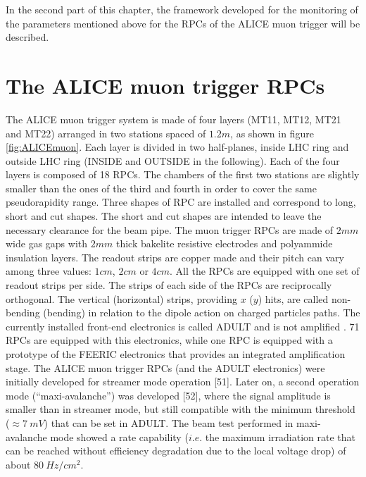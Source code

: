 
In the second part of this chapter, the framework developed for the monitoring of the parameters mentioned above for the RPCs of the ALICE muon trigger will be described.

\section{The ALICE muon trigger RPCs}
The ALICE muon trigger system is made of four layers (MT11, MT12, MT21 and MT22) arranged in two stations spaced of $1.2m$, as shown in figure \ref{fig:ALICEmuon}.
Each layer is divided in two half-planes, inside LHC ring and outside LHC ring (INSIDE and OUTSIDE in the following).
Each of the four layers is composed of 18 RPCs.
The chambers of the first two stations are slightly smaller than the ones of the third and fourth in order to cover the same pseudorapidity range.
Three shapes of RPC are installed and correspond to long, short and cut shapes.
The short and cut shapes are intended to leave the necessary clearance for the beam pipe.
The muon trigger RPCs are made of $2mm$ wide gas gaps with $2mm$ thick bakelite resistive electrodes and polyammide insulation layers.
The readout strips are copper made and their pitch can vary among three values: $1cm$, $2cm$ or $4cm$.
All the RPCs are equipped with one set of readout strips per side.
The strips of each side of the RPCs are reciprocally orthogonal.
The vertical (horizontal) strips, providing $x$ ($y$) hits, are called non-bending (bending) in relation to the dipole action on charged particles paths.
The currently installed front-end electronics is called ADULT and is not amplified \cite{Dupieux:2003bw}.
71 RPCs are equipped with this electronics, while one RPC is equipped with a prototype of the FEERIC electronics \cite{Marchisone:2017bcb} that provides an integrated amplification stage.
The ALICE muon trigger RPCs (and the ADULT electronics) were initially developed for streamer mode operation [51]. 
Later on, a second operation mode (“maxi-avalanche”) was developed [52], where the signal amplitude is smaller than in streamer mode, but still compatible with the minimum threshold ($\approx7\ mV$) that can be set in ADULT. 
The beam test performed in maxi-avalanche mode showed a rate capability ($i.e.$ the maximum irradiation rate that can be reached without efficiency degradation due to the local voltage drop) of about $80\ Hz/cm^2$. 
